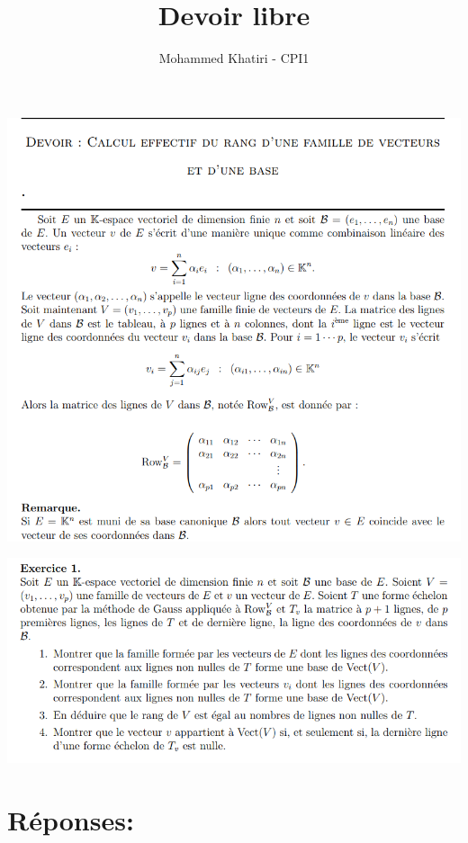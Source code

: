 \documentclass{article}
\title{Devoir libre}
\author{Mohammed Khatiri - CPI1}
\begin{document}
\maketitle

\begin{center}
    \includegraphics[scale = 0.7]{exo.png}
\end{center}
\newpage

\includegraphics[scale = 1]{questions.png}
\section[]{Réponses:}
\end{document}
